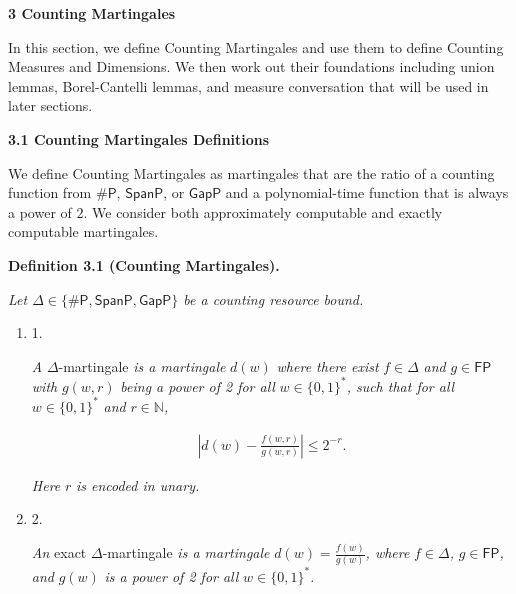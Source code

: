 \par\medskip\noindent\textbf{
3 Counting Martingales}\par




In this section, we define Counting Martingales and use them to define Counting Measures and Dimensions. We then work out their foundations including union lemmas, Borel-Cantelli lemmas, and measure conversation that will be used in later sections.\par




\par\medskip\noindent\textbf{
3.1 Counting Martingales Definitions}\par




We define Counting Martingales as martingales that are the ratio of a counting function from ${\mathsf{\#}\mathsf{P}}$, $\mathsf{SpanP}$, or $\mathsf{GapP}$ and a polynomial-time function that is always a power of $2$. We consider both approximately computable and exactly computable martingales.\par





\par\medskip\noindent\textbf{
\textbf{Definition 3.1}\textbf{ }(Counting Martingales)\textbf{.}
}\par



\emph{Let $\Delta\in\{{\mathsf{\#}\mathsf{P}},\mathsf{SpanP},\mathsf{GapP}\}$ be a counting resource bound.}\par


\begin{enumerate}


\item[] 
1. 


\emph{A }$\Delta$-martingale\emph{ is a martingale }$d(w)$\emph{
where there exist }$f\in\Delta$\emph{ and }$g\in\mathsf{FP}$\emph{ with }$g(w,r)$\emph{
being a power of 2 for all }$w\in\{0,1\}^{*}$\emph{, such that for all
}$w\in\{0,1\}^{*}$\emph{ and }$r\in\mathbb{N}$\emph{,}\par


\[\begin{gathered}
\left|d(w)-\frac{f(w,r)}{g(w,r)}\right|\leq 2^{-r}.
\end{gathered}\]


\emph{Here }$r$\emph{ is encoded in unary.}\par





\item[] 
2. 


\emph{An }exact $\Delta$-martingale\emph{ is a martingale }$d(w)=\frac{f(w)}{g(w)}$\emph{, where }$f\in\Delta$\emph{, }$g\in\mathsf{FP}$\emph{, and }$g(w)$\emph{
is a power of 2 for all }$w\in\{0,1\}^{*}$\emph{.}\par





\end{enumerate}



